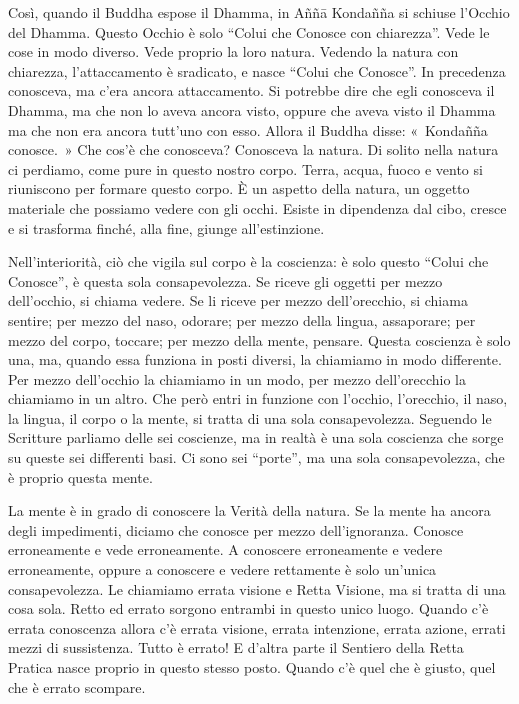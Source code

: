 Così, quando il Buddha espose il Dhamma, in Aññā Kondañña si schiuse
l'Occhio del Dhamma. Questo Occhio è solo ``Colui che Conosce con
chiarezza''. Vede le cose in modo diverso. Vede proprio la loro natura.
Vedendo la natura con chiarezza, l'attaccamento è sradicato, e nasce
``Colui che Conosce''. In precedenza conosceva, ma c'era ancora
attaccamento. Si potrebbe dire che egli conosceva il Dhamma, ma che non
lo aveva ancora visto, oppure che aveva visto il Dhamma ma che non era
ancora tutt'uno con esso. Allora il Buddha disse: «~Kondañña conosce.~»
Che cos'è che conosceva? Conosceva la natura. Di solito nella natura ci
perdiamo, come pure in questo nostro corpo. Terra, acqua, fuoco e vento
si riuniscono per formare questo corpo. È un aspetto della natura, un
oggetto materiale che possiamo vedere con gli occhi. Esiste in
dipendenza dal cibo, cresce e si trasforma finché, alla fine, giunge
all'estinzione.

Nell'interiorità, ciò che vigila sul corpo è la coscienza: è solo questo
``Colui che Conosce'', è questa sola consapevolezza. Se riceve gli
oggetti per mezzo dell'occhio, si chiama vedere. Se li riceve per mezzo
dell'orecchio, si chiama sentire; per mezzo del naso, odorare; per mezzo
della lingua, assaporare; per mezzo del corpo, toccare; per mezzo della
mente, pensare. Questa coscienza è solo una, ma, quando essa funziona in
posti diversi, la chiamiamo in modo differente. Per mezzo dell'occhio la
chiamiamo in un modo, per mezzo dell'orecchio la chiamiamo in un altro.
Che però entri in funzione con l'occhio, l'orecchio, il naso, la
lingua, il corpo o la mente, si tratta di una sola consapevolezza.
Seguendo le Scritture parliamo delle sei coscienze, ma in realtà è una
sola coscienza che sorge su queste sei differenti basi. Ci sono sei
``porte'', ma una sola consapevolezza, che è proprio questa mente.

La mente è in grado di conoscere la Verità della natura. Se la mente ha
ancora degli impedimenti, diciamo che conosce per mezzo dell'ignoranza.
Conosce erroneamente e vede erroneamente. A conoscere erroneamente e
vedere erroneamente, oppure a conoscere e vedere rettamente è solo
un'unica consapevolezza. Le chiamiamo errata visione e Retta Visione, ma
si tratta di una cosa sola. Retto ed errato sorgono entrambi in questo
unico luogo. Quando c'è errata conoscenza allora c'è errata visione,
errata intenzione, errata azione, errati mezzi di sussistenza. Tutto è
errato! E d'altra parte il Sentiero della Retta Pratica nasce proprio in
questo stesso posto. Quando c'è quel che è giusto, quel che è errato
scompare.

